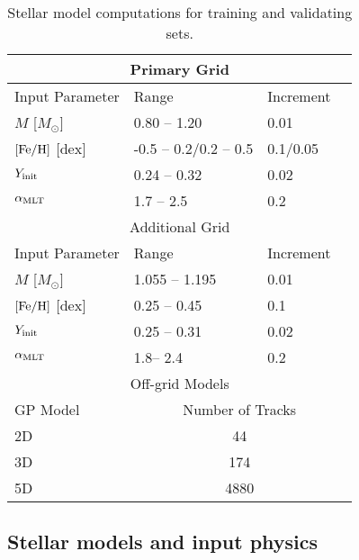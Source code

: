 \begin{table}
	\centering
	\caption{Stellar model computations for training and validating sets.}
	\label{tab:grid}
	\begin{tabular}{llll} %
		\hline
		\multicolumn{4}{c}{Primary Grid}\\
		\hline
		Input Parameter & Range & Increment \\
        \hline
	$M$ [$M_{\odot}$]  & 0.80 -- 1.20 &  0.01&\\
        $\rm{[Fe/H]}$ [dex] & -0.5 -- 0.2/0.2 -- 0.5 & 0.1/0.05\\
        	$Y_{\rm init}$ & 0.24 -- 0.32 & 0.02&\\
        $\alpha_{\rm{MLT}}$  & 1.7 -- 2.5&  0.2&\\
        \hline
       \multicolumn{4}{c}{Additional Grid}\\
	\hline
	Input Parameter & Range & Increment \\
        \hline
	$M$ [$M_{\odot}$]  & 1.055 -- 1.195 &  0.01&\\
        $\rm{[Fe/H]}$ [dex] & 0.25 -- 0.45 & 0.1\\
        	$Y_{\rm init}$ & 0.25 -- 0.31 & 0.02&\\
        $\alpha_{\rm{MLT}}$  & 1.8-- 2.4&  0.2&\\
        \hline
        \multicolumn{4}{c}{Off-grid Models}\\
        \hline
        GP Model & \multicolumn{3}{c}{Number of Tracks}\\
        \hline
        2D&\multicolumn{3}{c}{44}\\
        3D&\multicolumn{3}{c}{174}\\
        5D&\multicolumn{3}{c}{4880}\\
	\hline
	\end{tabular}
\end{table}

\subsection{Stellar models and input physics}\label{subsec:stellar_model}

